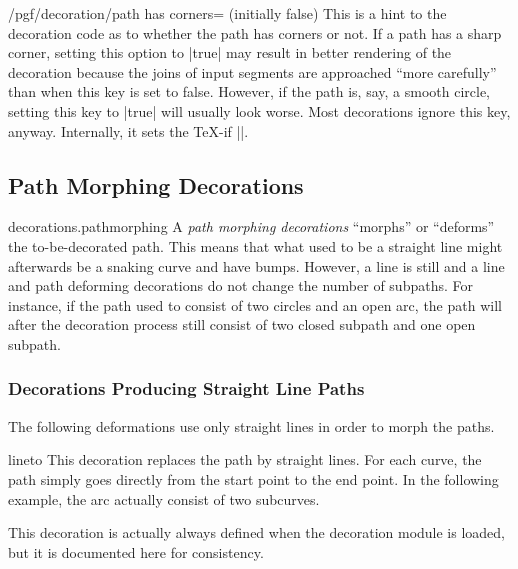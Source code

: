 \begin{key}{/pgf/decoration/path has corners= (initially false)}
  This is a hint to the decoration code as to whether the path has
  corners or not. If a path has a sharp corner, setting this option to
  |true| may result in better rendering of the decoration because the
  joins of input segments are approached ``more carefully'' than
  when this key is set to false. However, if the path is, say, a
  smooth circle, setting this key to |true| will usually look
  worse. Most decorations ignore this key, anyway. Internally, it sets
  the \TeX-if |\ifpgfdecoratepathhascorners|.
\end{key}


\subsection{Path Morphing Decorations}

\begin{pgflibrary}{decorations.pathmorphing}
  A \emph{path morphing decorations} ``morphs'' or ``deforms'' the
  to-be-decorated path. This means that what used to be a straight
  line might afterwards be a snaking curve and have bumps. However, a
  line is still and a line and path deforming decorations do not
  change the number of subpaths. For instance, if the path used to
  consist of two circles and an open arc, the path will after the
  decoration process still consist of two closed subpath and one open
  subpath.
\end{pgflibrary}


\subsubsection{Decorations Producing Straight Line Paths}

The following deformations use only straight lines in order to morph
the paths.

\begin{decoration}{lineto}
  This decoration replaces the path by straight lines. For each curve,
  the path simply goes directly from the start point to the end point.
  In the following example, the arc actually consist of two
  subcurves.

  This decoration is actually always defined when the decoration
  module is loaded, but it is documented here for consistency.
\begin{codeexample}[]
\end{codeexample}
\end{decoration}


